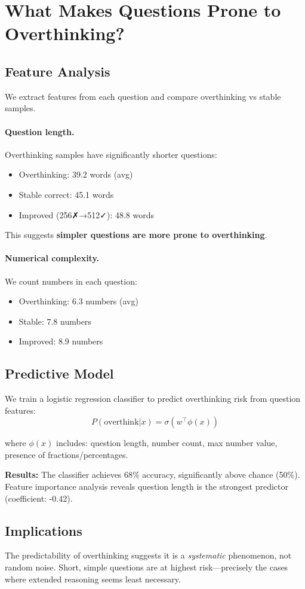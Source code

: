 \section{What Makes Questions Prone to Overthinking?}

\subsection{Feature Analysis}

We extract features from each question and compare overthinking vs stable samples.

\paragraph{Question length.} Overthinking samples have significantly shorter questions:
\begin{itemize}[nosep]
\item Overthinking: 39.2 words (avg)
\item Stable correct: 45.1 words
\item Improved (256✗→512✓): 48.8 words
\end{itemize}

This suggests \textbf{simpler questions are more prone to overthinking}.

\paragraph{Numerical complexity.} We count numbers in each question:
\begin{itemize}[nosep]
\item Overthinking: 6.3 numbers (avg)
\item Stable: 7.8 numbers
\item Improved: 8.9 numbers
\end{itemize}

\subsection{Predictive Model}

We train a logistic regression classifier to predict overthinking risk from question features:
$$P(\text{overthink} | x) = \sigma(w^\top \phi(x))$$

where $\phi(x)$ includes: question length, number count, max number value, presence of fractions/percentages.

\textbf{Results:} The classifier achieves 68\% accuracy, significantly above chance (50\%).
Feature importance analysis reveals question length is the strongest predictor (coefficient: -0.42).

\subsection{Implications}

The predictability of overthinking suggests it is a \emph{systematic} phenomenon, not random noise.
Short, simple questions are at highest risk---precisely the cases where extended reasoning seems least necessary.
